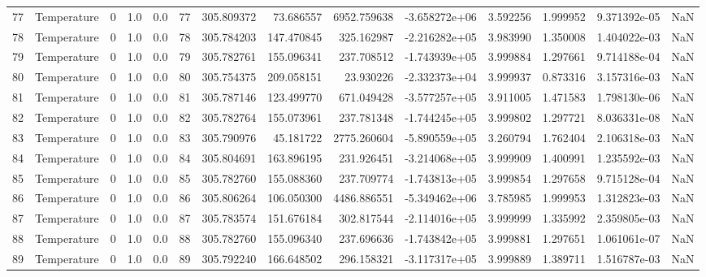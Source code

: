 \begin{tabular}{llrrrrrrrrrrrr}
77  &  Temperature &       0 &  1.0 &  0.0 &   77 &  305.809372 &    73.686557 &    6952.759638 & -3.658272e+06 &  3.592256 &  1.999952 &  9.371392e-05 &      NaN \\
78  &  Temperature &       0 &  1.0 &  0.0 &   78 &  305.784203 &   147.470845 &     325.162987 & -2.216282e+05 &  3.983990 &  1.350008 &  1.404022e-03 &      NaN \\
79  &  Temperature &       0 &  1.0 &  0.0 &   79 &  305.782761 &   155.096341 &     237.708512 & -1.743939e+05 &  3.999884 &  1.297661 &  9.714188e-04 &      NaN \\
80  &  Temperature &       0 &  1.0 &  0.0 &   80 &  305.754375 &   209.058151 &      23.930226 & -2.332373e+04 &  3.999937 &  0.873316 &  3.157316e-03 &      NaN \\
81  &  Temperature &       0 &  1.0 &  0.0 &   81 &  305.787146 &   123.499770 &     671.049428 & -3.577257e+05 &  3.911005 &  1.471583 &  1.798130e-06 &      NaN \\
82  &  Temperature &       0 &  1.0 &  0.0 &   82 &  305.782764 &   155.073961 &     237.781348 & -1.744245e+05 &  3.999802 &  1.297721 &  8.036331e-08 &      NaN \\
83  &  Temperature &       0 &  1.0 &  0.0 &   83 &  305.790976 &    45.181722 &    2775.260604 & -5.890559e+05 &  3.260794 &  1.762404 &  2.106318e-03 &      NaN \\
84  &  Temperature &       0 &  1.0 &  0.0 &   84 &  305.804691 &   163.896195 &     231.926451 & -3.214068e+05 &  3.999909 &  1.400991 &  1.235592e-03 &      NaN \\
85  &  Temperature &       0 &  1.0 &  0.0 &   85 &  305.782760 &   155.088360 &     237.709774 & -1.743813e+05 &  3.999854 &  1.297658 &  9.715128e-04 &      NaN \\
86  &  Temperature &       0 &  1.0 &  0.0 &   86 &  305.806264 &   106.050300 &    4486.886551 & -5.349462e+06 &  3.785985 &  1.999953 &  1.312823e-03 &      NaN \\
87  &  Temperature &       0 &  1.0 &  0.0 &   87 &  305.783574 &   151.676184 &     302.817544 & -2.114016e+05 &  3.999999 &  1.335992 &  2.359805e-03 &      NaN \\
88  &  Temperature &       0 &  1.0 &  0.0 &   88 &  305.782760 &   155.096340 &     237.696636 & -1.743842e+05 &  3.999881 &  1.297651 &  1.061061e-07 &      NaN \\
89  &  Temperature &       0 &  1.0 &  0.0 &   89 &  305.792240 &   166.648502 &     296.158321 & -3.117317e+05 &  3.999889 &  1.389711 &  1.516787e-03 &      NaN \\

\end{tabular}
